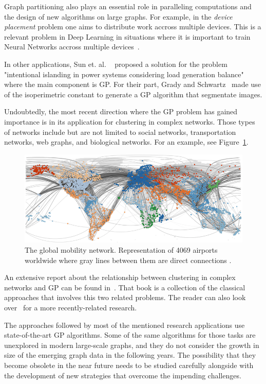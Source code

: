 Graph partitioning also plays an essential role in paralleling computations and the design of new algorithms on large graphs. For example, in the \textit{device placement} problem one aims to distribute work accross multiple devices. This is a relevant problem in Deep Learning in situations where it is important to train Neural Networks accross multiple devices~\cite{deviceplacement}.

In other applications, Sun et. al. ~\cite{islanding} proposed a solution for the problem "intentional islanding in power systems considering load generation balance" where the main component is GP. For their part, Grady and Schwartz~\cite{imagesegmentation} made use of the isoperimetric constant to generate a GP algorithm that segmentate images.


Undoubtedly, the most recent direction where the GP problem has gained importance is in its application for clustering in complex networks. Those types of networks include but are not limited to social networks, transportation networks, web graphs, and biological networks. For an example, see Figure~\ref{fig:complexnetwork}.

\begin{figure}[h!]
    \centering
    \includegraphics[scale=0.5]{complex_networks.png}
    \caption{The global mobility network. Representation of 4069 airports worldwide where gray lines between them are direct connections \cite{complexnetworks}.}
    \label{fig:complexnetwork}
\end{figure}

An extensive report about the relationship between clustering in complex networks and GP can be found in~\cite{clustering}. That book is a collection of the classical approaches that involves this two related problems. The reader can also look over~\cite{local_clustering} for a more recently-related research.


The approaches followed by most of the mentioned research applications use state-of-the-art GP algorithms. Some of the same algorithms for those tasks are unexplored in modern large-scale graphs, and they do not consider the growth in size of the emerging graph data in the following years. The possibility that they become obsolete in the near future needs to be studied carefully alongside with the development of new strategies that overcome the impending challenges.

